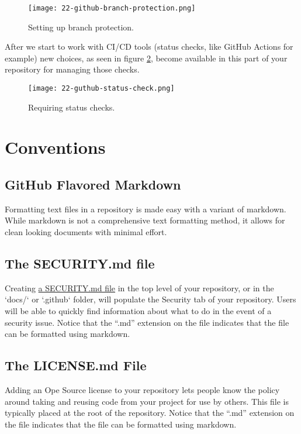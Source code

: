 \begin{figure}[!htb]
\centering
\texttt{[image: 22-github-branch-protection.png]}
\caption{Setting up branch protection.}
\label{branchprotect}
\end{figure}

\justifying
After we start to work with CI/CD tools (status checks, like GitHub Actions for example) new choices, as seen in figure \ref{statuscheck}, become
available in this part of your repository for managing those checks.

\begin{figure}
\centering
\texttt{[image: 22-guthub-status-check.png]}
\caption{Requiring status checks.}
\label{statuscheck}
\end{figure}


\section{Conventions}

\subsection{GitHub Flavored Markdown}

\justifying
Formatting text files in a repository is made easy with a variant of markdown. While markdown is not a
comprehensive text formatting method, it allows for clean looking documents with minimal effort.

\subsection{The SECURITY.md file}

\justifying
Creating \href{https://docs.github.com/en/code-security/getting-started/adding-a-security-policy-to-your-repository}{a SECURITY.md file} in the top level of your repository, or in the `docs/` or `.github` folder, will populate the Security tab
of your repository. Users will be able to quickly find information about what to do in the event of a security issue. Notice that the ``.md'' extension on the file indicates that the file can be formatted using markdown.

\subsection{The LICENSE.md File}

\justifying
Adding an Ope Source license to your repository lets people know the policy around taking and reusing
code from your project for use by others. This file is typically placed at the root of the repository. Notice that the ``.md'' extension on the file indicates that the file can be formatted using markdown.

